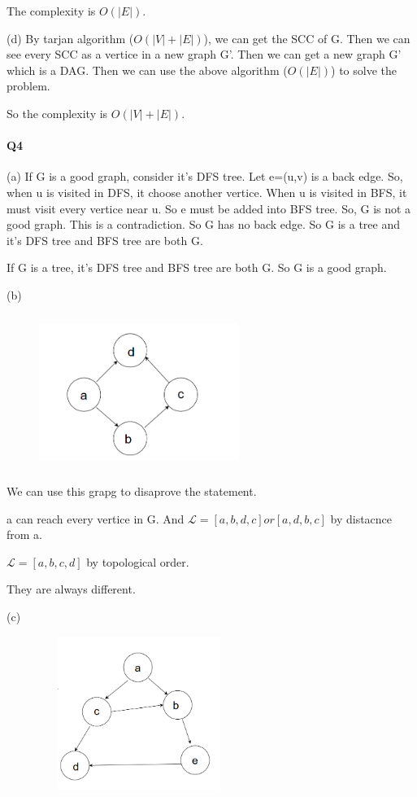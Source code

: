 \documentclass[UTF8]{ctexart}
\renewcommand{\(}{\left(}
\renewcommand{\)}{\right)}
\begin{document}
The complexity is $O\({\left| E\right|}\)$.

(d) By tarjan algorithm ($O\({\left| V \right| + \left| E\right|}\)$), we can get the SCC of G. Then we can see every SCC as a vertice in a new graph G'.
Then we can get a new graph G' which is a DAG. Then we can use the above algorithm ($O\({\left| E\right|}\)$) to solve the problem.

So the complexity is $O\({\left| V \right| + \left| E\right|}\)$. 

\paragraph{Q4}

(a) If G is a good graph, consider it's DFS tree. Let e=(u,v) is a back edge. So, when u is visited in 
DFS, it choose another vertice. When u is visited in BFS, it must visit every vertice near u. So 
e must be added into BFS tree. So, G is not a good graph. This is a contradiction. So G has no back edge.
So G is a tree and it's DFS tree and BFS tree are both G. 

If G is a tree, it's DFS tree and BFS tree are both G. So G is a good graph.

(b) 
\begin{figure}[htbp]
    \centering
    \includegraphics[width=6.5cm,height=5cm]{1.png}
    \end{figure} 

We can use this grapg to disaprove the statement.

a can reach every vertice in G.
And $\mathcal{L} =[a,b,d,c] or [a,d,b,c]$ by distacnce from a. 

$\mathcal{L} =[a,b,c,d]$ by topological order.

They are always different.

(c)
\begin{figure}[htbp]
    \centering
    \includegraphics[width=6.5cm,height=5cm]{2.png}
    \end{figure} 
\end{document}
